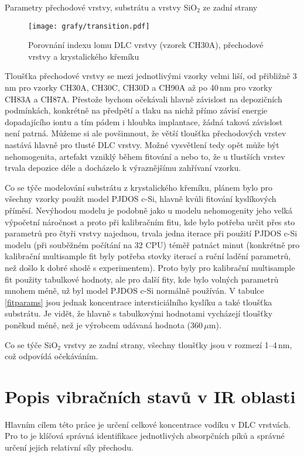 \begin{table}[htbp]
 \centering
	\renewcommand{\tabcolsep}{4pt}
 
 \caption{Parametry přechodové vrstvy, substrátu a vrstvy SiO$_2$ ze zadní strany}
\label{tsb-params}
\end{table}

\begin{figure}[htbp]
	\texttt{[image: grafy/transition.pdf]}
	\caption{Porovnání indexu lomu DLC vrstvy (vzorek CH30A), přechodové vrstvy a krystalického křemíku} 
	\label{transition}
\end{figure}

Tloušťka přechodové vrstvy se mezi jednotlivými vzorky velmi liší, od přibližně 3\,nm pro vzorky CH30A, CH30C, CH30D a CH90A až po 40\,nm pro vzorky CH83A a CH87A. Přestože bychom očekávali hlavně závislost na depozičních podmínkách, konkrétně na předpětí a tlaku na nichž přímo závisí energie dopadajícího iontu a tím pádem i hloubka implantace, žádná taková závislost není patrná. 
Můžeme si ale povšimnout, že větší tloušťka přechodových vrstev nastává hlavně pro tlusté DLC vrstvy. Možné vysvětlení tedy opět může být nehomogenita, artefakt vzniklý během fitování a nebo to, že u tlustších vrstev trvala depozice déle a docházelo k výraznějšímu zahřívaní vzorku.

Co se týče modelování substrátu z krystalického křemíku, plánem bylo pro všechny vzorky použít model PJDOS c-Si, hlavně kvůli fitování kyslíkových příměsí. 
Nevýhodou modelu je podobně jako u modelu nehomogenity jeho velká výpočetní náročnost a proto při kalibračním fitu, kde bylo potřeba určit přes sto parametrů pro čtyři vrstvy najednou, trvala jedna iterace při použití PJDOS c-Si modelu (při souběžném počítání na 32 CPU) téměř patnáct minut (konkrétně pro kalibrační multisample fit byly potřeba stovky iterací a ruční ladění parametrů, než došlo k dobré shodě s experimentem). 
Proto byly pro kalibrační multisample fit použity tabulkové hodnoty, ale pro další fity, kde bylo volných parametrů mnohem méně, už byl model 
PJDOS c-Si normálně používán. V tabulce \ref{fitparams} jsou jednak koncentrace intersticiálního kyslíku a také tloušťka substrátu. Je vidět, že hlavně s tabulkovými hodnotami vycházejí tloušťky poněkud méně, než je výrobcem udávaná hodnota (360\,$\mu$m).

Co se týče SiO$_2$ vrstvy ze zadní strany, všechny tloušťky jsou v rozmezí 1--4\,nm, což odpovídá očekáváním.


\section{Popis vibračních stavů v IR oblasti}
Hlavním cílem této práce je určení celkové koncentrace vodíku v DLC vrstvách. Pro to je klíčová správná identifikace jednotlivých absorpčních píků a správné určení jejich relativní síly přechodu.

